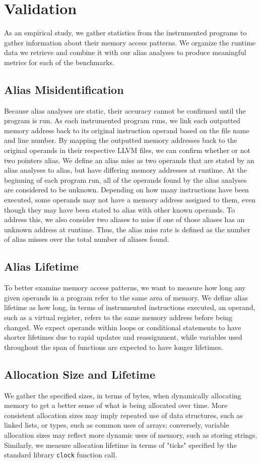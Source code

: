 \chapter{Validation}

As an empirical study, we gather statistics from the instrumented programs to gather information about their memory access patterns. We organize the runtime data we retrieve and combine it with our alias analyses to produce meaningful metrics for each of the benchmarks.

\section{Alias Misidentification}
Because alias analyses are static, their accuracy cannot be confirmed until the program is run. As each instrumented program runs, we link each outputted memory address back to its original instruction operand based on the file name and line number. By mapping the outputted memory addresses back to the original operands in their respective LLVM files, we can confirm whether or not two pointers alias. We define an alias miss as two operands that are stated by an alias analyses to alias, but have differing memory addresses at runtime. At the beginning of each program run, all of the operands found by the alias analyses are considered to be unknown. Depending on how many instructions have been executed, some operands may not have a memory address assigned to them, even though they may have been stated to alias with other known operands. To address this, we also consider two aliases to miss if one of those aliases has an unknown address at runtime. Thus, the alias miss rate is defined as the number of alias misses over the total number of aliases found.

\section{Alias Lifetime}
To better examine memory access patterns, we want to measure how long any given operands in a program refer to the same area of memory. We define alias lifetime as how long, in terms of instrumented instructions executed, an operand, such as a virtual register, refers to the same memory address before being changed. We expect operands within loops or conditional statements to have shorter lifetimes due to rapid updates and reassignment, while variables used throughout the span of functions are expected to have longer lifetimes.

\section{Allocation Size and Lifetime}
We gather the specified sizes, in terms of bytes, when dynamically allocating memory to get a better sense of what is being allocated over time. More consistent allocation sizes may imply repeated use of data structures, such as linked lists, or types, such as common uses of arrays; conversely, variable allocation sizes may reflect more dynamic uses of memory, such as storing strings. Similarly, we measure allocation lifetime in terms of "ticks" specified by the standard library \texttt{clock} function call.
